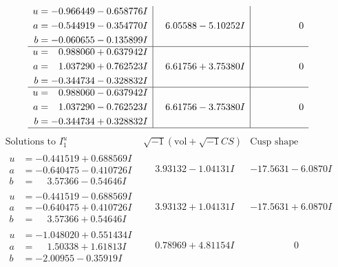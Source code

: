 \documentclass[1p]{elsarticle_modified}
\theoremstyle{definition}
\newcommand{\I}{\sqrt{-1}}
\begin{document}
$$\begin{array}{c|c|c}
\begin{aligned}
u &= -0.966449 - 0.658776 I \\
a &= -0.544919 - 0.354770 I \\
b &= -0.060655 - 0.135899 I\end{aligned}
 & \phantom{-}6.05588 - 5.10252 I & \phantom{-0.000000 } 0 \\ \hline\begin{aligned}
u &= \phantom{-}0.988060 + 0.637942 I \\
a &= \phantom{-}1.037290 + 0.762523 I \\
b &= -0.344734 - 0.328832 I\end{aligned}
 & \phantom{-}6.61756 + 3.75380 I & \phantom{-0.000000 } 0 \\ \hline\begin{aligned}
u &= \phantom{-}0.988060 - 0.637942 I \\
a &= \phantom{-}1.037290 - 0.762523 I \\
b &= -0.344734 + 0.328832 I\end{aligned}
 & \phantom{-}6.61756 - 3.75380 I & \phantom{-0.000000 } 0\\
 \hline 
 \end{array}$$\newpage$$\begin{array}{c|c|c}  
\text{Solutions to }I^u_{1}& \I (\text{vol} + \sqrt{-1}CS) & \text{Cusp shape}\\
 \hline 
\begin{aligned}
u &= -0.441519 + 0.688569 I \\
a &= -0.640475 - 0.410726 I \\
b &= \phantom{-}3.57366 - 0.54646 I\end{aligned}
 & \phantom{-}3.93132 - 1.04131 I & -17.5631 - 6.0870 I \\ \hline\begin{aligned}
u &= -0.441519 - 0.688569 I \\
a &= -0.640475 + 0.410726 I \\
b &= \phantom{-}3.57366 + 0.54646 I\end{aligned}
 & \phantom{-}3.93132 + 1.04131 I & -17.5631 + 6.0870 I \\ \hline\begin{aligned}
u &= -1.048020 + 0.551434 I \\
a &= \phantom{-}1.50338 + 1.61813 I \\
b &= -2.00955 - 0.35919 I\end{aligned}
 & \phantom{-}0.78969 + 4.81154 I & \phantom{-0.000000 } 0 \\ \hline\begin{aligned}

\end{aligned}
\end{array}$$
\end{document}
